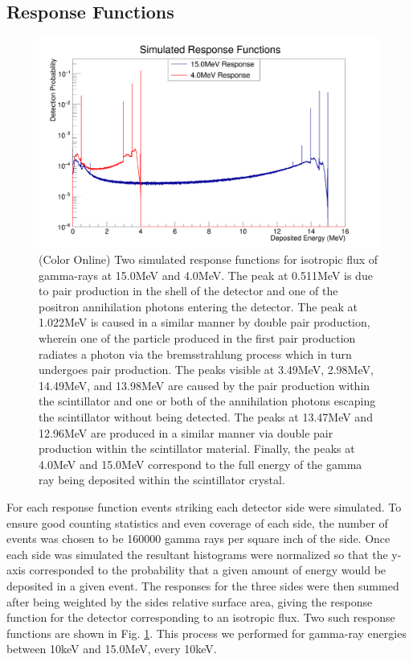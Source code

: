 \documentclass[5p]{elsarticle}
\begin{document}
\subsection{Response Functions}
\begin{figure}[h]
\begin{center}
\includegraphics[width=\linewidth]{response_png}
\caption{(Color Online) Two simulated response functions for isotropic flux of gamma-rays at 15.0MeV and 4.0MeV. The peak at 0.511MeV is due to pair production in the shell of the detector and one of the positron annihilation photons entering the detector. The peak at 1.022MeV is caused in a similar manner by double pair production, wherein one of the particle produced in the first pair production radiates a photon via the bremsstrahlung process which in turn undergoes pair production. The peaks visible at 3.49MeV, 2.98MeV, 14.49MeV, and 13.98MeV are caused by the pair production within the scintillator and one or both of the annihilation photons escaping the scintillator without being detected. The peaks at 13.47MeV and 12.96MeV are produced in a similar manner via double pair production within the scintillator material. Finally, the peaks at 4.0MeV and 15.0MeV correspond to the full energy of the gamma ray being deposited within the scintillator crystal.}
\label{fig-resp-func}
\end{center}
\end{figure}
For each response function events striking each detector side were simulated. To ensure good counting statistics and even coverage of each side, the number of events was chosen to be 160000 gamma rays per square inch of the side. Once each side was simulated the resultant histograms were normalized so that the y-axis corresponded to the probability that a given amount of energy would be deposited in a given event. The responses for the three sides were then summed after being weighted by the sides relative surface area, giving the response function for the detector corresponding to an isotropic flux. Two such response functions are shown in Fig. \ref{fig-resp-func}. This process we performed for gamma-ray energies between 10keV and 15.0MeV, every 10keV.
\end{document}
